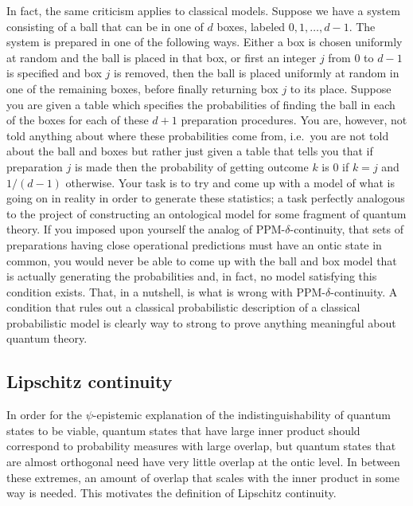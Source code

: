 \documentclass[DIV=calc,paper=a4,fontsize=11pt,twocolumn]{scrartcl} %
\theoremstyle{definition}
\theoremstyle{plain}
\begin{document}
In fact, the same criticism applies to classical models.  Suppose we
have a system consisting of a ball that can be in one of $d$ boxes,
labeled $0,1,\ldots,d-1$.  The system is prepared in one of the
following ways.  Either a box is chosen uniformly at random and the
ball is placed in that box, or first an integer $j$ from $0$ to $d-1$
is specified and box $j$ is removed, then the ball is placed uniformly
at random in one of the remaining boxes, before finally returning box
$j$ to its place.  Suppose you are given a table which specifies the
probabilities of finding the ball in each of the boxes for each of
these $d+1$ preparation procedures.  You are, however, not told
anything about where these probabilities come from, i.e.\ you are not
told about the ball and boxes but rather just given a table that tells
you that if preparation $j$ is made then the probability of getting
outcome $k$ is $0$ if $k=j$ and $1/(d-1)$ otherwise.  Your task is to
try and come up with a model of what is going on in reality in order
to generate these statistics; a task perfectly analogous to the
project of constructing an ontological model for some fragment of
quantum theory.  If you imposed upon yourself the analog of
PPM-$\delta$-continuity, that sets of preparations having close
operational predictions must have an ontic state in common, you would
never be able to come up with the ball and box model that is actually
generating the probabilities and, in fact, no model satisfying this
condition exists.  That, in a nutshell, is what is wrong with
PPM-$\delta$-continuity.  A condition that rules out a classical
probabilistic description of a classical probabilistic model is
clearly way to strong to prove anything meaningful about quantum
theory.

\subsection{Lipschitz continuity}

\label{Lips}

In order for the $\psi$-epistemic explanation of the
indistinguishability of quantum states to be viable, quantum states
that have large inner product should correspond to probability
measures with large overlap, but quantum states that are almost
orthogonal need have very little overlap at the ontic level.  In
between these extremes, an amount of overlap that scales with the
inner product in some way is needed.  This motivates the definition of
Lipschitz continuity.
\end{document}
